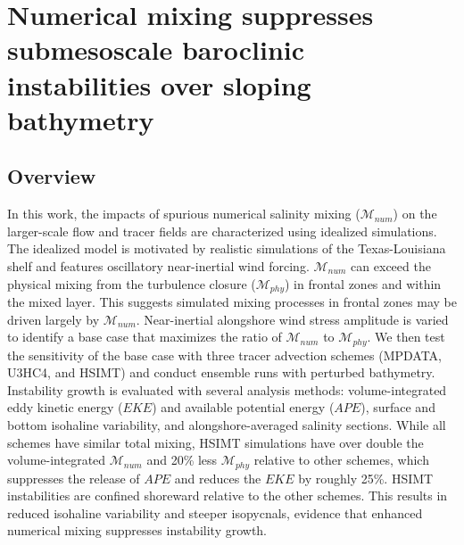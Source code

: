 

\chapter[footnote={This manuscript is \textit{in revision} for the \textit{Journal of Advances in Modeling Earth Systems}. Reprinted with permission from the \textit{Earth and Space Science Open Archive} under the terms of the CC BY 4.0 license. Full citation:  Schlichting, D., Hetland, R. D., \& Jones, C. S. (2024). Numerical mixing suppresses submesoscale baroclinic instabilities over sloping bathymetry. Authorea Preprints. \url{ https://essopenarchive.org/doi/full/10.22541/essoar.170983234.49281676}}]{Numerical mixing suppresses submesoscale baroclinic instabilities over sloping bathymetry}

\section{Overview}
In this work, the impacts of spurious numerical salinity mixing ($\mathcal{M}_{num}$) on the larger-scale flow and tracer fields are characterized using idealized simulations. The idealized model is motivated by realistic simulations of the Texas-Louisiana shelf and features oscillatory near-inertial wind forcing. $\mathcal{M}_{num}$ can exceed the physical mixing from the turbulence closure ($\mathcal{M}_{phy}$) in frontal zones and within the mixed layer. This suggests simulated mixing processes in frontal zones may be driven largely by $\mathcal{M}_{num}$. Near-inertial alongshore wind stress amplitude is varied to identify a base case that maximizes the ratio of $\mathcal{M}_{num}$ to $\mathcal{M}_{phy}$. We then test the sensitivity of the base case with three tracer advection schemes (MPDATA, U3HC4, and HSIMT) and conduct ensemble runs with perturbed bathymetry. Instability growth is evaluated with several analysis methods: volume-integrated eddy kinetic energy ($EKE$) and available potential energy ($APE$), surface and bottom isohaline variability, and alongshore-averaged salinity sections. While all schemes have similar total mixing, HSIMT simulations have over double the volume-integrated $\mathcal{M}_{num}$ and 20\% less $\mathcal{M}_{phy}$ relative to other schemes, which suppresses the release of $APE$ and reduces the $EKE$ by roughly 25\%. HSIMT instabilities are confined shoreward relative to the other schemes. This results in reduced isohaline variability and steeper isopycnals, evidence that enhanced numerical mixing suppresses instability growth.

